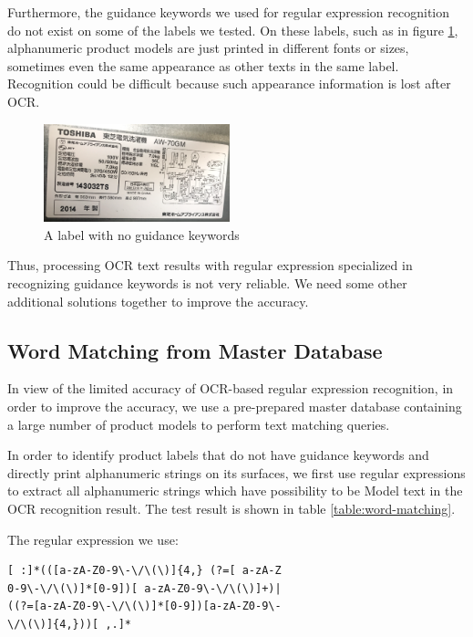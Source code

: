 \documentclass[technicalreport]{ieicej}
\begin{document}
        Furthermore, the guidance keywords we used for regular expression recognition do not exist on some of the labels we tested. On these labels, such as in figure \ref{fig:no-guidance.png}, alphanumeric product models are just printed in different fonts or sizes, sometimes even the same appearance as other texts in the same label. Recognition could be difficult because such appearance information is lost after OCR.
        
        \begin{figure}[t] 
            \begin{center}
            \includegraphics[width=0.48\textwidth]{figure/no-guidance.png}
            \end{center}
            \caption{A label with no guidance keywords}
            \label{fig:no-guidance.png}
        \end{figure}

        Thus, processing OCR text results with regular expression specialized in recognizing guidance keywords is not very reliable. We need some other additional solutions together to improve the accuracy.
        
    
    \subsection{Word Matching from Master Database}
        In view of the limited accuracy of OCR-based regular expression recognition, in order to improve the accuracy, we use a pre-prepared master database containing a large number of product models to perform text matching queries.
        
        In order to identify product labels that do not have guidance keywords and directly print alphanumeric strings on its surfaces, we first use regular expressions to extract all alphanumeric strings which have possibility to be Model text in the OCR recognition result. The test result is shown in table \ref{table:word-matching}.
    
        The regular expression we use:

        \begin{center}
        \begin{BVerbatim}
[ :]*(([a-zA-Z0-9\-\/\(\)]{4,} (?=[ a-zA-Z
0-9\-\/\(\)]*[0-9])[ a-zA-Z0-9\-\/\(\)]+)|
((?=[a-zA-Z0-9\-\/\(\)]*[0-9])[a-zA-Z0-9\-
\/\(\)]{4,}))[ ,.]*
        \end{BVerbatim}
        \end{center}
\end{document}
